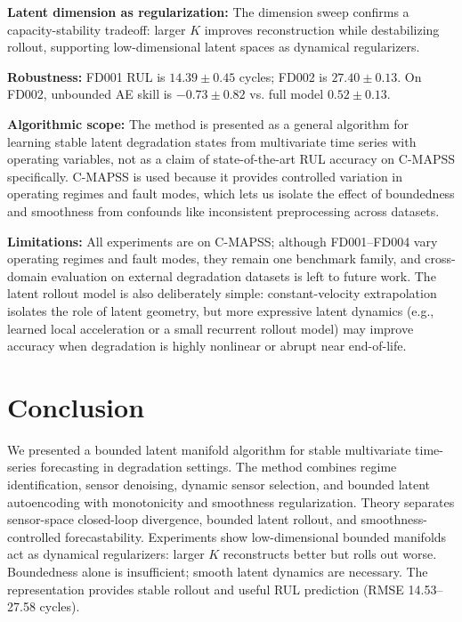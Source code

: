 \documentclass[letterpaper]{article}
\begin{document}
\textbf{Latent dimension as regularization:} The dimension sweep confirms a capacity-stability tradeoff: larger $K$ improves reconstruction while destabilizing rollout, supporting low-dimensional latent spaces as dynamical regularizers.

\textbf{Robustness:} FD001 RUL is $14.39 \pm 0.45$ cycles; FD002 is $27.40 \pm 0.13$. On FD002, unbounded AE skill is $-0.73 \pm 0.82$ vs. full model $0.52 \pm 0.13$.

\textbf{Algorithmic scope:} The method is presented as a general algorithm for learning stable latent degradation states from multivariate time series with operating variables, not as a claim of state-of-the-art RUL accuracy on C-MAPSS specifically. C-MAPSS is used because it provides controlled variation in operating regimes and fault modes, which lets us isolate the effect of boundedness and smoothness from confounds like inconsistent preprocessing across datasets.

\textbf{Limitations:} All experiments are on C-MAPSS; although FD001--FD004 vary operating regimes and fault modes, they remain one benchmark family, and cross-domain evaluation on external degradation datasets is left to future work. The latent rollout model is also deliberately simple: constant-velocity extrapolation isolates the role of latent geometry, but more expressive latent dynamics (e.g., learned local acceleration or a small recurrent rollout model) may improve accuracy when degradation is highly nonlinear or abrupt near end-of-life.

\section{Conclusion}

We presented a bounded latent manifold algorithm for stable multivariate time-series forecasting in degradation settings. The method combines regime identification, sensor denoising, dynamic sensor selection, and bounded latent autoencoding with monotonicity and smoothness regularization. Theory separates sensor-space closed-loop divergence, bounded latent rollout, and smoothness-controlled forecastability. Experiments show low-dimensional bounded manifolds act as dynamical regularizers: larger $K$ reconstructs better but rolls out worse. Boundedness alone is insufficient; smooth latent dynamics are necessary. The representation provides stable rollout and useful RUL prediction (RMSE 14.53--27.58 cycles).
\end{document}
